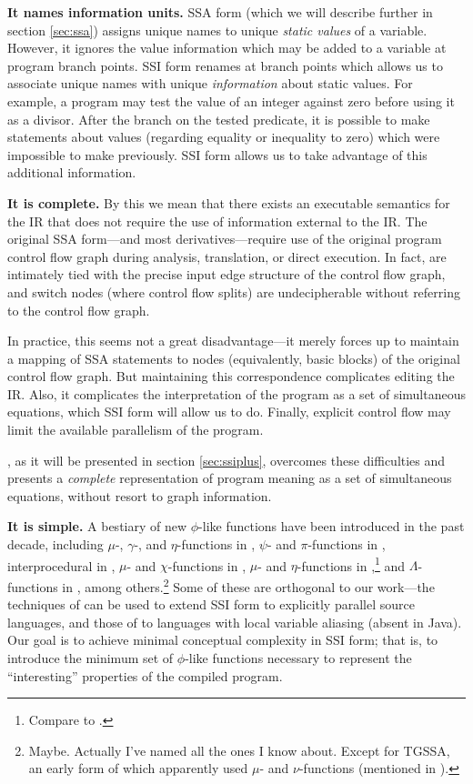 \documentclass[12pt,titlepage,twoside]{article}
\begin{document}
\textbf{It names information units.}  SSA form (which we will describe
further in section \ref{sec:ssa}) assigns unique names to unique \emph{static
values} of a variable.  However, it ignores the value information
which may be added to a variable at program branch points.  SSI form
renames at branch points which allows us to associate unique names
with unique \emph{information} about static values.  For example, a
program may test the value of an integer against zero before using it
as a divisor.  After the branch on the tested predicate, it is
possible to make statements about values (regarding equality or
inequality to zero) which were impossible to make previously.  SSI
form allows us to take advantage of this additional information.

\textbf{It is complete.}\label{sec:complete}
By this we mean that there exists an
executable semantics for the IR that does not require the use of
information external to the IR.  The original SSA form---and most
derivatives---require use of the original program control flow graph
during analysis, translation, or direct execution.  In fact,
 are intimately tied with the precise input edge
structure of the control flow graph, and switch nodes (where control
flow splits) are undecipherable without referring to the control flow
graph.

In practice, this seems not a great disadvantage---it merely forces up to
maintain a mapping of SSA statements to nodes (equivalently, basic
blocks) of the original control flow graph.  But maintaining this
correspondence complicates editing the IR.  Also, it complicates the
interpretation of the program as a set of simultaneous equations,
which SSI form will allow us to do.  Finally, explicit control flow
may limit the available parallelism of the program.

\ssiplus, as it will be presented in section \ref{sec:ssiplus},
overcomes these difficulties and presents a \emph{complete}
representation of program meaning as a set of simultaneous equations,
without resort to graph information.

\textbf{It is simple.}  A bestiary of new $\phi$-like functions have
been introduced in the past decade, including
$\mu$-, $\gamma$-, and $\eta$-functions in \cite{ballance90:pdw,tu95:gssa},
$\psi$- and $\pi$-functions in \cite{lee99:parssa},
interprocedural  in \cite{liao99:issa},
$\mu$- and $\chi$-functions in \cite{chow96:hssa},
$\mu$- and $\eta$-functions in \cite{gerlek95:inductssa},\footnote{Compare to
\cite{ballance90:pdw,tu95:gssa}.} and $\Lambda$-functions in \cite{lo98:ssu},
among others.\footnote{Maybe.
Actually I've named all the ones I know about.  Except for TGSSA,
an early form of which apparently used $\mu$- and $\nu$-functions (mentioned in
\cite{weise94:vdg}).}
Some of these are orthogonal to our work---the techniques of
\cite{lee99:parssa} can be used to extend SSI form to explicitly
parallel source languages, and those of \cite{chow96:hssa} to
languages with local variable aliasing (absent in Java).  Our goal is
to achieve minimal conceptual complexity in SSI form; that is, to
introduce the minimum set of $\phi$-like functions necessary to
represent the ``interesting'' properties of the compiled program.
\end{document}
